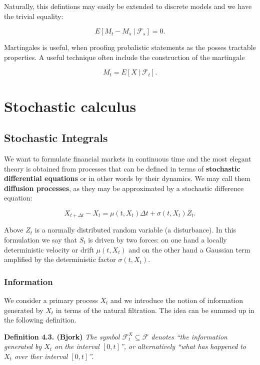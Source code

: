 \documentclass[
]{book}
\begin{document}
Naturally, this defintions may easily be extended to discrete models and we have the trivial equality:

\[E[M_t-M_s\ \vert\ \mathcal{F}_s]=0.\]

Martingales is useful, when proofing probalistic statements as the posses tractable properties. A useful technique often include the construction of the martingale

\[M_t=E[X\ \vert\ \mathcal{F}_t].\]

\hypertarget{stochastic-calculus}{%
\chapter{Stochastic calculus}\label{stochastic-calculus}}

\hypertarget{stochastic-integrals}{%
\section{Stochastic Integrals}\label{stochastic-integrals}}

We want to formulate financial markets in continuous time and the most elegant theory is obtained from processes that can be defined in terms of \textbf{stochastic differential equations} or in other words by their dynamics. We may call them \textbf{diffusion processes}, as they may be approximated by a stochastic difference equation:

\[
X_{t+\Delta t}-X_t=\mu(t,X_t)\Delta t+\sigma(t,X_t)Z_t.\tag{4.1}
\]

Above \(Z_t\) is a normally distributed random variable (a disturbance). In this formulation we say that \(S_t\) is driven by two forces: on one hand a locally deterministic velocity or drift \(\mu(t,X_t)\) and on the other hand a Gaussian term amplified by the deterministic factor \(\sigma(t,X_t)\).

\hypertarget{information}{%
\subsection{Information}\label{information}}

We consider a primary process \(X_t\) and we introduce the notion of information generated by \(X_t\) in terms of the natural filtration. The idea can be summed up in the following definition.

\textbf{Definition 4.3. (Bjork)} \emph{The symbol \(\mathcal{F}^X_t\subseteq\mathcal{F}\) denotes ``the information generated by \(X_t\) on the interval \([0,t]\)'', or alternatively ``what has happened to \(X_t\) over ther interval \([0,t]\)''.}
\end{document}
